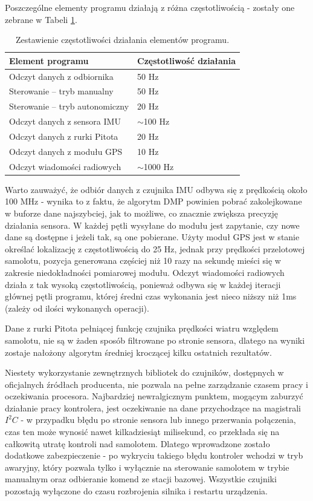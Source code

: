 \documentclass[12pt, a4paper]{article}
\begin{document}
Poszczególne elementy programu działają z różna częstotliwością - zostały one zebrane w Tabeli \ref{table:hz}.


\begin{table}[H]
\centering
\begin{tabular}{| l | l |}
\hline
Element programu & Częstotliwość działania \\
\hline
Odczyt danych z odbiornika & 50 Hz \\
Sterowanie – tryb manualny & 50 Hz \\
Sterowanie – tryb autonomiczny & 20 Hz \\
Odczyt danych z sensora IMU & $\sim$100 Hz \\
Odczyt danych z rurki Pitota & 20 Hz \\
Odczyt danych z modułu GPS & 10 Hz \\
Odczyt wiadomości radiowych & $\sim$1000 Hz \\
\hline

\end{tabular}
\caption{Zestawienie częstotliwości działania elementów programu.}
\label{table:hz}
\end{table}

Warto zauważyć, że odbiór danych z czujnika IMU odbywa się z prędkością około 100 MHz - wynika to z faktu, że algorytm DMP powinien pobrać zakolejkowane w buforze dane najszybciej, jak to możliwe, co znacznie zwiększa precyzję działania sensora. W każdej pętli wysyłane do modułu jest zapytanie, czy nowe dane są dostępne i jeżeli tak, są one pobierane. Użyty moduł GPS jest w stanie określać lokalizację z częstotliwością do 25 Hz, jednak przy prędkości przelotowej samolotu, pozycja generowana częściej niż 10 razy na sekundę mieści się w zakresie niedokładności pomiarowej modułu. Odczyt wiadomości radiowych działa z tak wysoką częstotliwością, ponieważ odbywa się w każdej iteracji głównej pętli programu, której średni czas wykonania jest nieco niższy niż 1ms (zależy od ilości wykonanych operacji).

Dane z rurki Pitota pełniącej funkcję czujnika prędkości wiatru względem samolotu, nie są w żaden sposób filtrowane po stronie sensora, dlatego na wyniki zostaje nałożony algorytm średniej kroczącej kilku ostatnich rezultatów.

Niestety wykorzystanie zewnętrznych bibliotek do czujników, dostępnych w oficjalnych źródłach producenta, nie pozwala na pełne zarządzanie czasem pracy i oczekiwania procesora. Najbardziej newralgicznym punktem, mogącym zaburzyć działanie pracy kontrolera, jest oczekiwanie na dane przychodzące na magistrali $I^2C$ - w przypadku błędu po stronie sensora lub innego przerwania połączenia, czas ten może wynosić nawet kilkadziesiąt milisekund, co przekłada się na całkowitą utratę kontroli nad samolotem. Dlatego wprowadzone zostało dodatkowe zabezpieczenie - po wykryciu takiego błędu kontroler wchodzi w tryb awaryjny, który pozwala tylko i wyłącznie na sterowanie samolotem w trybie manualnym oraz odbieranie komend ze stacji bazowej. Wszystkie czujniki pozostają wyłączone do czasu rozbrojenia silnika i restartu urządzenia.
\end{document}
